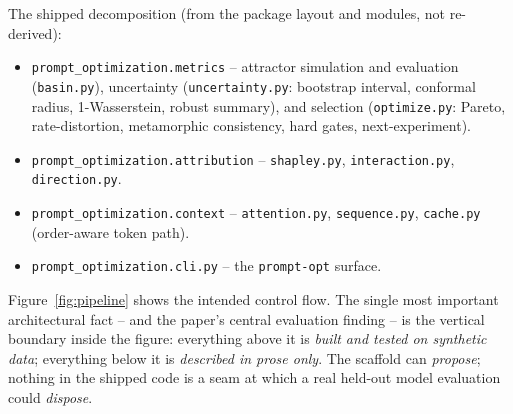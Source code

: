 The shipped decomposition (from the package layout and modules, not re-derived):

\begin{itemize}[leftmargin=*]
  \item \texttt{prompt\_optimization.metrics} -- attractor simulation and
  evaluation (\texttt{basin.py}), uncertainty (\texttt{uncertainty.py}:
  bootstrap interval, conformal radius, 1-Wasserstein, robust summary), and
  selection (\texttt{optimize.py}: Pareto, rate-distortion, metamorphic
  consistency, hard gates, next-experiment).
  \item \texttt{prompt\_optimization.attribution} -- \texttt{shapley.py},
  \texttt{interaction.py}, \texttt{direction.py}.
  \item \texttt{prompt\_optimization.context} -- \texttt{attention.py},
  \texttt{sequence.py}, \texttt{cache.py} (order-aware token path).
  \item \texttt{prompt\_optimization.cli.py} -- the \texttt{prompt-opt} surface.
\end{itemize}

Figure~\ref{fig:pipeline} shows the intended control flow. The single most
important architectural fact -- and the paper's central evaluation finding -- is
the vertical boundary inside the figure: everything above it is \emph{built and
tested on synthetic data}; everything below it is \emph{described in prose only}.
The scaffold can \emph{propose}; nothing in the shipped code is a seam at which a
real held-out model evaluation could \emph{dispose}.


